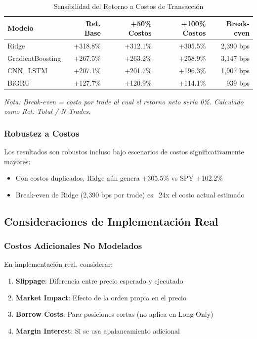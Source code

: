 \begin{table}[htbp]
\centering
\caption{Sensibilidad del Retorno a Costos de Transacci\'on}
\label{tab:cost_sensitivity}
\small
\begin{tabular}{@{}lrrrr@{}}
\toprule
\textbf{Modelo} & \textbf{Ret. Base} & \textbf{+50\% Costos} & \textbf{+100\% Costos} & \textbf{Break-even} \\
\midrule
Ridge & +318.8\% & +312.1\% & +305.5\% & 2,390 bps \\
GradientBoosting & +267.5\% & +263.2\% & +258.9\% & 3,147 bps \\
CNN\_LSTM & +207.1\% & +201.7\% & +196.3\% & 1,907 bps \\
BiGRU & +127.7\% & +120.9\% & +114.1\% & 939 bps \\
\bottomrule
\end{tabular}
\vspace{0.2cm}
\small\textit{
\small
Nota: Break-even = costo por trade al cual el retorno neto ser\'ia 0\%. Calculado como Ret. Total / N Trades.}
\end{table}

\subsubsection{Robustez a Costos}

Los resultados son robustos incluso bajo escenarios de costos significativamente mayores:

\begin{itemize}
    \item Con costos duplicados, Ridge a\'un genera +305.5\% vs SPY +102.2\%
    \item Break-even de Ridge (2,390 bps por trade) es ~24x el costo actual estimado
\end{itemize}

\subsection{Consideraciones de Implementaci\'on Real}
\label{subsec:implementation_considerations}

\subsubsection{Costos Adicionales No Modelados}

En implementaci\'on real, considerar:

\begin{enumerate}
    \item \textbf{Slippage}: Diferencia entre precio esperado y ejecutado
    \item \textbf{Market Impact}: Efecto de la orden propia en el precio
    \item \textbf{Borrow Costs}: Para posiciones cortas (no aplica en Long-Only)
    \item \textbf{Margin Interest}: Si se usa apalancamiento adicional
\end{enumerate}

